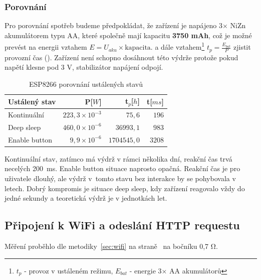 \documentclass[a4paper, 12pt]{report}
\begin{document}
    \subsubsection{Porovnání}
    Pro porovnání spotřeb budeme předpokládat, že zařízení je napájeno 3$\times$ NiZn akumulátorem typu AA, které společně mají kapacitu \textbf{3750 mAh}, což je možné prevést na energii vztahem $E = U_{aku}\times \textrm{kapacita}$.
    a dále vztahem\footnote{$ t_{p}$ - provoz v ustáleném režimu, $ E_{bat}$ - energie 3$\times$ AA akumulátorů} $ t_{p} = \frac{E_{bat}}{P}$ zjistit provozní čas (). Zařízení není schopno dosáhnout této výdrže protože pokud napětí klesne pod 3 V, stabilizátor napájení odpojí.

    \begin{table}[h!]
        \centering
        \caption{ESP8266 porovnání ustálených stavů}
        \begin{tabular}{||l|r r r||}
            \hline
            Ustálený stav & P[$W$]                 & t$_{p}$[$h$]  & t[$ms$] \\
            \hline
            Kontinuální   & $223,3 \times 10^{-3}$ & $75,6$        & $196$   \\
            Deep sleep    & $460,0 \times 10^{-6}$ & $36 993,1$    & $983$   \\
            Enable button & $9,9\times 10^{-6}$    & $1 704 545,0$ & $3 208$ \\
            \hline
        \end{tabular}
        \label{tab:esp8266-klidove-rezimy-porovnani}
    \end{table}
    Kontinuální stav, zatímco má výdrž v rámci několika dní, reakční čas trvá necelých 200~ms. Enable button situace naprosto opačná. Reakční čas je pro uživatele dlouhý, ale výdrž v~tomto stavu bez interakce by se pohybovala v letech. Dobrý kompromis je situace deep sleep, kdy zařízení reagovalo vždy do jedné sekundy a teoretická výdrž je v jednotkách let.\\

    \subsection{Připojení k WiFi a odeslání HTTP requestu}
    Měření proběhlo dle metodiky~\ref{sec:wifi} na straně~\pageref{sec:wifi} na bočníku 0,7 \si{\ohm}.
\end{document}
